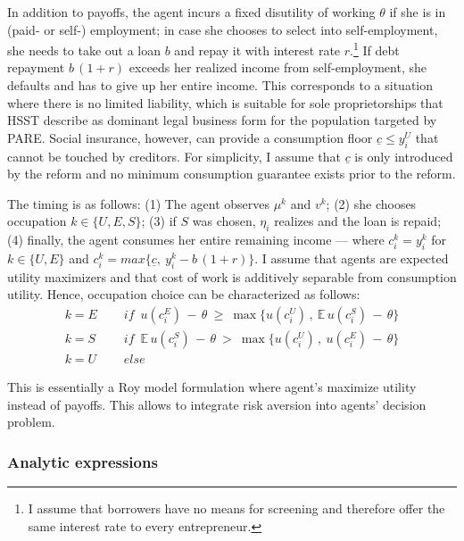 In addition to payoffs, the agent incurs a fixed disutility of working $\theta$ if she is in (paid- or self-) employment; in case she chooses to select into self-employment, she needs to take out a loan $b$ and repay it with interest rate $r$.\footnote{I assume that borrowers have no means for screening and therefore offer the same interest rate to every entrepreneur.} If debt repayment $b \, (1+r)$ exceeds her realized income from self-employment, she defaults and has to give up her entire income. This corresponds to a situation where there is no limited liability, which is suitable for sole proprietorships that HSST describe as dominant legal business form for the population targeted by PARE. Social insurance, however, can provide a consumption floor $\underline{c} \leq y_i^U$ that cannot be touched by creditors. For simplicity, I assume that $\underline{c}$ is only introduced by the reform and no minimum consumption guarantee exists prior to the reform. \newline

\noindent The timing is as follows: (1) The agent observes $\mu^k$ and $v^k$; (2) she chooses occupation $k \in \{U, E, S\}$; (3) if $S$ was chosen, $\eta_i$ realizes and the loan is repaid; (4) finally, the agent consumes her entire remaining income --- where $c_i^k = y_i^k$ for $k \in \{U, E\}$ and $c_i^k =  max\{\underline{c}, \: y_i^k  - b \, (1+r)\}$. I assume that agents are expected utility maximizers and that cost of work is additively separable from consumption utility. Hence, occupation choice can be characterized as follows:
\begin{align}
k = E \quad & \textit{ if } \, u(c^E_i) \, - \, \theta \:  \geq \:  \max\bigg\{u(c_i^U) \, , \: \mathbb{E} \, u(c_i^S)  \, - \, \theta \bigg\} \\[3pt]
k = S \quad & \textit{ if }  \, \mathbb{E} \, u(c_i^S) \, - \, \theta  \:  > \:  \max\bigg\{u(c_i^U) \, , \: u(c^E_i)  \, - \, \theta \bigg\} \\[3pt]
k = U \quad & \textit{ else} 
\end{align}

This is essentially a Roy model formulation where agent's maximize utility instead of payoffs. This allows to integrate risk aversion into agents' decision problem.


\subsubsection*{Analytic expressions}

